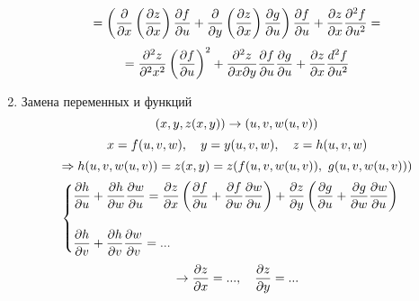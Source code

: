 \documentclass[main]{subfiles}
\begin{document}
\begin{enumerate}
\begin{Example}
      \[= \left(\dfrac{\partial}{\partial x} \left(\dfrac{\partial z}{\partial x}\right) \dfrac{\partial f}{\partial u} + \dfrac{\partial}{\partial y}\left(\dfrac{\partial z}{\partial x}\right) \dfrac{\partial g}{\partial u}\right) \dfrac{\partial f}{\partial u} + \dfrac{\partial z}{\partial x} \dfrac{\partial^2 f}{\partial u^2} =\]
      \[= \dfrac{\partial^2 z}{\partial^2 x^2} \left(\dfrac{\partial f}{\partial u}\right)^2 + \dfrac{\partial^2 z}{\partial x \partial y} \dfrac{\partial f}{\partial u} \dfrac{\partial g}{\partial u} + \dfrac{\partial z}{\partial x} \dfrac{d^2 f}{\partial u^2}\]
    \end{Example}
    \item Замена переменных и функций
    \[(x,y, z(x,y)) \rightarrow (u,v, w(u,v))\]
    \[x = f(u,v,w),\quad y=y(u,v,w),\quad z = h(u,v,w)\]
    \[\Ra h(u,v,w(u,v)) = z(x,y) = z(f(u,v,w(u,v)),\ g(u,v,w(u,v)))\]
    \[\begin{cases}
      \dfrac{\partial h}{\partial u} + \dfrac{\partial h}{\partial w} \dfrac{\partial w}{\partial u} = \dfrac{\partial z}{\partial x} \left(\dfrac{\partial f}{\partial u} + \dfrac{\partial f}{\partial w} \dfrac{\partial w}{\partial u}\right) + \dfrac{\partial z}{\partial y} \left(\dfrac{\partial g}{\partial u} + \dfrac{\partial g}{\partial w} \dfrac{\partial w}{\partial u}\right)\\ \\
      \dfrac{\partial h}{\partial v} + \dfrac{\partial h}{\partial v} \dfrac{\partial w}{\partial v} = ...
    \end{cases}\]
    \[\rightarrow \dfrac{\partial z}{\partial x} = ...,\quad \dfrac{\partial z}{\partial y} = ...\]


\end{enumerate}
\end{document}
